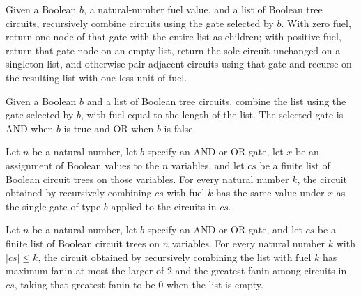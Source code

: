 \begin{definition}
\label{BoolCircuit.combineFuel}
\leanok
{}
Given a Boolean $b$, a natural-number fuel value, and a list of Boolean tree circuits,
recursively combine circuits using the gate selected by $b$. With zero fuel, return one
node of that gate with the entire list as children; with positive fuel, return that gate
node on an empty list, return the sole circuit unchanged on a singleton list, and
otherwise pair adjacent circuits using that gate and recurse on the resulting list with
one less unit of fuel.
\end{definition}

\begin{definition}
\label{BoolCircuit.combine}
\leanok
{}
Given a Boolean $b$ and a list of Boolean tree circuits, combine the list using the gate
selected by $b$, with fuel equal to the length of the list. The selected gate is AND
when $b$ is true and OR when $b$ is false.
\end{definition}

\begin{theorem}
\label{BoolCircuit.combineFuel_eval}
\leanok
{}
Let $n$ be a natural number, let $b$ specify an AND or OR gate, let $x$ be an assignment
of Boolean values to the $n$ variables, and let $cs$ be a finite list of Boolean circuit
trees on those variables. For every natural number $k$, the circuit obtained by
recursively combining $cs$ with fuel $k$ has the same value under $x$ as the single gate
of type $b$ applied to the circuits in $cs$.
\end{theorem}

\begin{theorem}
\label{BoolCircuit.combineFuel_maxFanin}
\leanok
{}
Let $n$ be a natural number, let $b$ specify an AND or OR gate, and let $cs$ be a finite
list of Boolean circuit trees on $n$ variables. For every natural number $k$ with
$|cs|\le k$, the circuit obtained by recursively combining the list with fuel $k$ has
maximum fanin at most the larger of $2$ and the greatest fanin among circuits in $cs$,
taking that greatest fanin to be $0$ when the list is empty.
\end{theorem}

